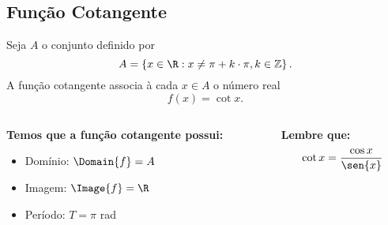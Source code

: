 \subsection{Função Cotangente}
\begin{frame}
  \begin{definition}
    Seja $A$ o conjunto definido por
    \begin{equation*}
      A=\left\{x\in\R : x\not= \pi + k\cdot\pi, k\in\mathbb{Z}\right\}.
    \end{equation*}
    A função cotangente associa à cada $x\in A$ o número real
    \begin{equation*}
      f(x)=\cot{x}.
    \end{equation*}
  \end{definition}
  \begin{columns}[onlytextwidth]
    \begin{column}{0.49\textwidth}
      \begin{highlight}
        \textbf{Temos que a função cotangente possui:}
        \begin{itemize}
          \item Domínio: $\Domain{f} = A$
          \item Imagem: $\Image{f} = \R$
          \item Período: $T = \pi$ rad
        \end{itemize}
      \end{highlight}
    \end{column}
    \begin{column}{0.49\textwidth}
      \begin{highlight}
        \textbf{Lembre que:}
        \begin{equation*}
          \cot{x} = \frac{\cos{x}}{\sen{x}}
        \end{equation*}
      \end{highlight}
    \end{column}
  \end{columns}
\end{frame}

\begin{frame}[c]
  \begin{figure}
  \end{figure}
\end{frame}

